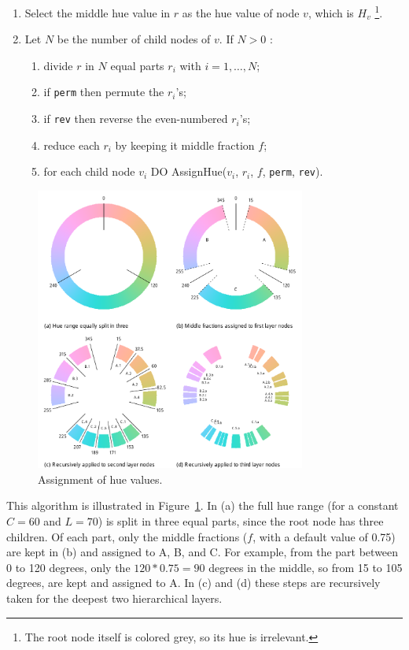 \documentclass[review,journal]{vgtc}         %
\begin{document}
%
\begin{enumerate} \itemsep1pt \parskip0pt 
\item Select the middle hue value in $r$ as the hue value of node $v$, which is $H_v$ \footnote{The root node itself is colored grey, so its hue is irrelevant.}.
\item Let $N$ be the number of child nodes of $v$. If $N>0$ :
\begin{enumerate}[i] \itemsep1pt \parskip0pt 
\item divide $r$ in $N$ equal parts $r_i$ with $i=1,\ldots,N$;
\item if \texttt{perm} then permute the $r_i$'s;
\item if \texttt{rev} then reverse the even-numbered $r_i$'s;
\item reduce each $r_i$ by keeping it middle fraction $f$;
\item for each child node $v_i$ DO AssignHue($v_i$, $r_i$, $f$, \texttt{perm}, \texttt{rev}).
\end{enumerate}
\end{enumerate}

\begin{figure}[tb]
  \centering
  \includegraphics[width=3.5in]{hcl_method2.pdf}
  \caption{Assignment of hue values.}\label{fig:wheel}
\end{figure}

This algorithm is illustrated in Figure~\ref{fig:wheel}. In (a) the full hue range (for a constant $C=60$ and $L=70$)  is split in three equal parts, since the root node has three children. Of each part, only the middle fractions ($f$, with a default value of 0.75) are kept in (b) and assigned to A, B, and C. For example, from the part between 0 to 120 degrees, only the $120*0.75=90$ degrees in the middle, so from 15 to 105 degrees, are kept and assigned to A. In (c) and (d) these steps are recursively taken for the deepest two hierarchical layers.
\end{document}
